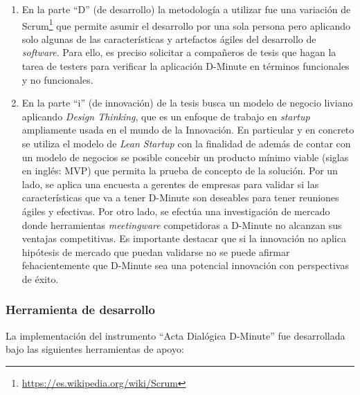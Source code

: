 \begin{enumerate}[A]
	\item En la parte “D” (de desarrollo) la metodología a utilizar fue una variación de Scrum\footnote{\url{https://es.wikipedia.org/wiki/Scrum}} que permite asumir el desarrollo por una sola persona pero aplicando solo algunas de las características y artefactos ágiles del desarrollo de \textit{software}. Para ello, es preciso solicitar a compañeros de tesis que hagan la tarea de testers para verificar la aplicación D-Minute en términos funcionales y no funcionales.

	\item En la parte “i” (de innovación) de la tesis busca un modelo de negocio liviano aplicando \textsl{Design Thinking}, que es un enfoque de trabajo en \textsl{startup} ampliamente usada en el mundo de la Innovación. En particular y en concreto se utiliza el modelo de \textsl{Lean Startup} con la finalidad de además de contar con un modelo de negocios se posible concebir un producto mínimo viable (siglas en inglés: MVP) que permita la prueba de concepto de la solución. Por un lado, se aplica una encuesta a gerentes de empresas para validar si las características que va a tener D-Minute son deseables para tener reuniones ágiles y efectivas. Por otro lado, se efectúa una investigación de mercado donde herramientas \textit{meetingware} competidoras a D-Minute no alcanzan sus ventajas competitivas. Es importante destacar que si la innovación no aplica hipótesis de mercado que puedan validarse no se puede afirmar fehacientemente que D-Minute sea una potencial innovación con perspectivas de éxito.
		
\end{enumerate}

\subsubsection{Herramienta de desarrollo}

La implementación del instrumento “Acta Dialógica D-Minute” fue desarrollada bajo las siguientes herramientas de apoyo:


